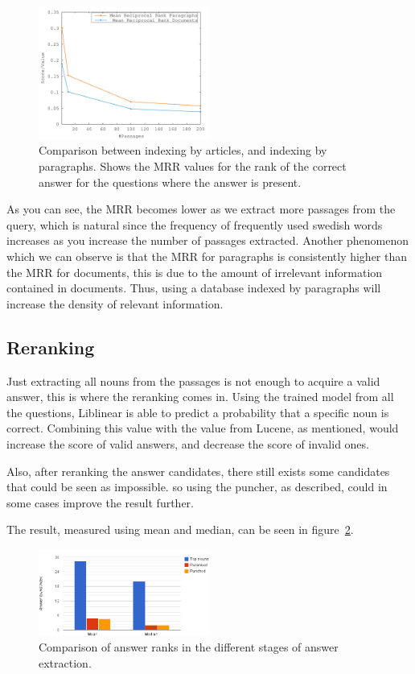 \begin{figure}[h!]
  \centering
  \includegraphics[width=0.5\textwidth]{figures/median.pdf}
  \caption{Comparison between indexing by articles, and indexing by paragraphs. 
  Shows the MRR values for the rank of the correct answer for the questions where 
  the answer is present.}
  \label{fig:median}
\end{figure}

As you can see, the MRR becomes lower as we extract more passages from the query, which
is natural since the frequency of frequently used swedish words increases as you increase the number
of passages extracted. Another phenomenon which we can observe is that the MRR for 
paragraphs is consistently higher than the MRR for documents, this is due to the amount of irrelevant
information contained in documents. Thus, using a database indexed by paragraphs will increase 
the density of relevant information. 

\subsection{Reranking}
Just extracting all nouns from the passages is not enough to acquire a valid answer, this is where the reranking comes in.
Using the trained model from all the questions, Liblinear is able to predict a probability that a specific noun is correct.
Combining this value with the value from Lucene, as mentioned, would increase the score of valid answers, and decrease the score of invalid ones.

Also, after reranking the answer candidates, there still exists some candidates that could be seen as impossible.
so using the puncher, as described, could in some cases improve the result further.

The result, measured using mean and median, can be seen in figure~\ref{fig:meanmedian}.

\begin{figure}[h!]
  \centering
  \hspace*{-0.6cm}
  \includegraphics[width=0.5\textwidth]{figures/meanMedian.png}
  \caption{Comparison of answer ranks in the different stages of answer extraction.}
  \label{fig:meanmedian}
\end{figure}

